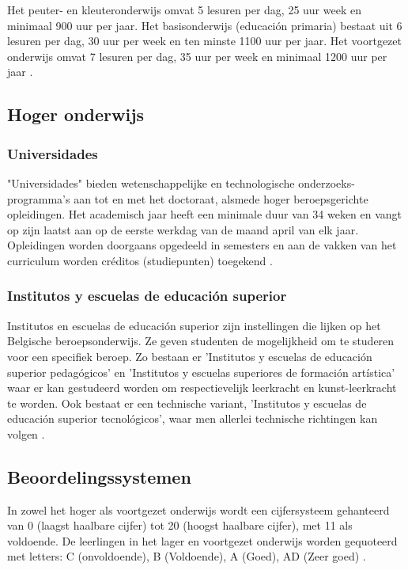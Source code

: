 Het peuter- en kleuteronderwijs omvat 5 lesuren per dag, 25 uur week en minimaal 900 uur per jaar. Het basisonderwijs (educación primaria) bestaat uit 6 lesuren per dag, 30 uur per week en ten minste 1100 uur per jaar. Het voortgezet onderwijs omvat 7 lesuren per dag, 35 uur per week en minimaal 1200 uur per jaar \autocite{Nuffic2015}.



\subsection{Hoger onderwijs}
\subsubsection{Universidades}
 "Universidades" bieden wetenschappelijke en technologische onderzoeks-programma’s aan tot en met het doctoraat, alsmede hoger beroepsgerichte opleidingen. Het academisch jaar heeft een minimale duur van 34 weken en vangt op zijn laatst aan op de eerste werkdag van de maand april van elk jaar. Opleidingen worden doorgaans opgedeeld in semesters en aan de vakken van het curriculum worden créditos (studiepunten) toegekend \autocite{Nuffic2015}.
 
 \subsubsection{Institutos y escuelas de educación superior }
Institutos en escuelas de educación superior zijn instellingen die lijken op het Belgische beroepsonderwijs. Ze geven studenten de mogelijkheid om te studeren voor een specifiek beroep. Zo bestaan er 'Institutos y escuelas de educación superior pedagógicos' en 'Institutos y escuelas superiores de formación artística' waar er kan gestudeerd worden om respectievelijk leerkracht en kunst-leerkracht te worden. Ook bestaat er een technische variant, 'Institutos y escuelas de educación superior tecnológicos', waar men allerlei technische richtingen kan volgen \autocite{Nuffic2015}.



\subsection{Beoordelingssystemen}
In zowel het hoger als voortgezet onderwijs wordt een cijfersysteem gehanteerd van 0 (laagst haalbare cijfer) tot 20 (hoogst haalbare cijfer), met 11 als voldoende. De leerlingen in het lager en voortgezet onderwijs worden gequoteerd met letters: C (onvoldoende), B (Voldoende), A (Goed), AD (Zeer goed) \autocite{Nuffic2015}.

